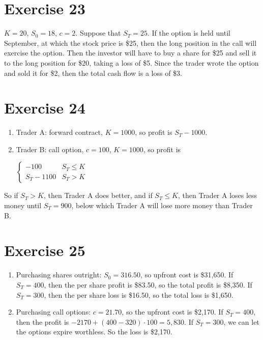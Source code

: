 \documentclass{article}
\begin{document}
\section*{Exercise 23}
$K = 20$, $S_0 = 18$, $c = 2$. Suppose that $S_T = 25$. If the option is held until
September, at which the stock price is \$25, then the long position in the call
will exercise the option. Then the investor will have to buy a share for \$25 and
sell it to the long position for \$20, taking a loss of \$5. Since the trader
wrote the option and sold it for \$2, then the total cash flow is a loss of \$3.

\section*{Exercise 24}
\begin{enumerate}
    \item Trader A: forward contract, $K = 1000$, so profit is $S_T - 1000$.
    \item Trader B: call option, $c = 100$, $K = 1000$, so profit is
    \begin{center}
        $\begin{cases}
            -100 & S_T \leq K \\
            S_T - 1100 & S_T > K
        \end{cases}$
    \end{center}
\end{enumerate}
\begin{flushleft}
    So if $S_T > K$, then Trader A does better, and if $S_T \leq K$, then Trader A loses less money until $S_T = 900$, below which Trader A will lose more money than Trader B.
\end{flushleft}

\section*{Exercise 25}
\begin{enumerate}
    \item Purchasing shares outright: $S_0 = 316.50$, so upfront cost is \$31,650. If $S_T = 400$, then the per share profit is
    \$83.50, so the total profit is \$8,350. If $S_T = 300$, then the per share loss is \$16.50, so the total loss is \$1,650.
    \item Purchasing call options: $c = 21.70$, so the upfront cost is \$2,170. 
    If $S_T = 400$, then the profit is $-2170 + (400 - 320) \cdot 100 = 5,830$.
    If $S_T = 300$, we can let the options expire worthless. So the loss is \$2,170.
\end{enumerate}
\end{document}
